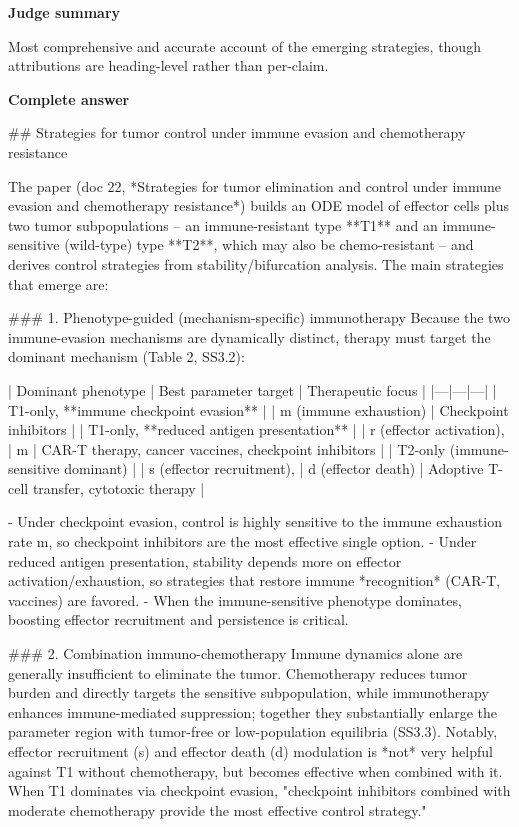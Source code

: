 \documentclass[10pt]{article}
\begin{document}
\textbf{Judge summary}
\begin{EvidenceText}
Most comprehensive and accurate account of the emerging strategies, though attributions are heading-level rather than per-claim.
\end{EvidenceText}

\textbf{Complete answer}
\begin{AnswerText}
## Strategies for tumor control under immune evasion and chemotherapy resistance

The paper (doc 22, *Strategies for tumor elimination and control under immune evasion and chemotherapy resistance*) builds an ODE model of effector cells plus two tumor subpopulations -- an immune-resistant type **T1** and an immune-sensitive (wild-type) type **T2**, which may also be chemo-resistant -- and derives control strategies from stability/bifurcation analysis. The main strategies that emerge are:

### 1. Phenotype-guided (mechanism-specific) immunotherapy
Because the two immune-evasion mechanisms are dynamically distinct, therapy must target the dominant mechanism (Table 2, SS3.2):

| Dominant phenotype | Best parameter target | Therapeutic focus |
|---|---|---|
| T1-only, **immune checkpoint evasion** | | m (immune exhaustion) | Checkpoint inhibitors |
| T1-only, **reduced antigen presentation** | | r (effector activation), | m | CAR-T therapy, cancer vaccines, checkpoint inhibitors |
| T2-only (immune-sensitive dominant) | | s (effector recruitment), | d (effector death) | Adoptive T-cell transfer, cytotoxic therapy |

- Under checkpoint evasion, control is highly sensitive to the immune exhaustion rate m, so checkpoint inhibitors are the most effective single option.
- Under reduced antigen presentation, stability depends more on effector activation/exhaustion, so strategies that restore immune *recognition* (CAR-T, vaccines) are favored.
- When the immune-sensitive phenotype dominates, boosting effector recruitment and persistence is critical.

### 2. Combination immuno-chemotherapy
Immune dynamics alone are generally insufficient to eliminate the tumor. Chemotherapy reduces tumor burden and directly targets the sensitive subpopulation, while immunotherapy enhances immune-mediated suppression; together they substantially enlarge the parameter region with tumor-free or low-population equilibria (SS3.3). Notably, effector recruitment (s) and effector death (d) modulation is *not* very helpful against T1 without chemotherapy, but becomes effective when combined with it. When T1 dominates via checkpoint evasion, "checkpoint inhibitors combined with moderate chemotherapy provide the most effective control strategy."


\end{AnswerText}
\end{document}
